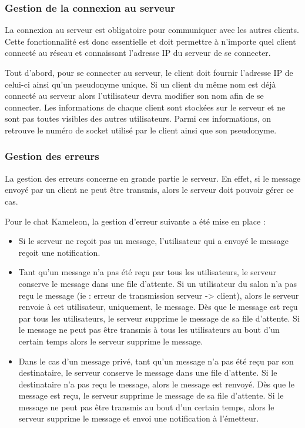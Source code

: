         \subsubsection{Gestion de la connexion au serveur}
            La connexion au serveur est obligatoire pour communiquer avec les autres clients. Cette fonctionnalité est donc essentielle et doit permettre à n'importe quel client connecté au réseau et connaissant l'adresse IP du serveur de se connecter.
            
            Tout d'abord, pour se connecter au serveur, le client doit fournir l'adresse IP de celui-ci ainsi qu'un pseudonyme unique. Si un client du même nom est déjà connecté au serveur alors l'utilisateur devra modifier son nom afin de se connecter. Les informations de chaque client sont stockées sur le serveur et ne sont pas toutes visibles des autres utilisateurs. Parmi ces informations, on retrouve le numéro de socket utilisé par le client ainsi que son pseudonyme.        
        
        \subsubsection{Gestion des erreurs}
            La gestion des erreurs concerne en grande partie le serveur. En effet, si le message envoyé par un client ne peut être transmis, alors le serveur doit pouvoir gérer ce cas. 
            
            Pour le chat Kameleon, la gestion d'erreur suivante a été mise en place :    
            \begin{itemize}
                \item Si le serveur ne reçoit pas un message, l'utilisateur qui a envoyé le message reçoit une notification.
                \item Tant qu'un message n'a pas été reçu par tous les utilisateurs, le serveur conserve le message dans une file d'attente. Si un utilisateur du salon n'a pas reçu le message (ie : erreur de transmission serveur -> client), alors le serveur renvoie à cet utilisateur, uniquement, le message. Dès que le message est reçu par tous les utilisateurs, le serveur supprime le message de sa file d'attente. Si le message ne peut pas être transmis à tous les utilisateurs au bout d'un certain temps alors le serveur supprime le message. 
                \item Dans le cas d'un message privé, tant qu'un message n'a pas été reçu par son destinataire, le serveur conserve le message dans une file d'attente. Si le destinataire n'a pas reçu le message, alors le message est renvoyé. Dès que le message est reçu, le serveur supprime le message de sa file d'attente. Si le message ne peut pas être transmis au bout d'un certain temps, alors le serveur supprime le message et envoi une notification à l'émetteur.
            \end{itemize}
        

